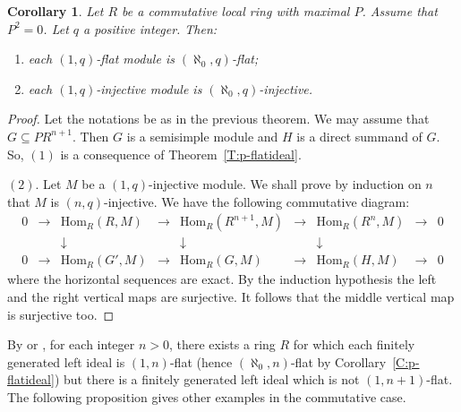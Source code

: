 \documentclass{amsart}
\newtheorem{corollary}[theorem]{Corollary}
\begin{document}
\begin{corollary} 
\label{C:OneAlepFlat} Let $R$ be a commutative local ring with maximal $P$. Assume that $P^2=0$. Let $q$ a positive integer. Then:
\begin{enumerate}
\item  each $(1,q)$-flat module is $(\aleph_0,q)$-flat;
\item  each $(1,q)$-injective module is $(\aleph_0,q)$-injective.
\end{enumerate}
\end{corollary}
\begin{proof}  Let the notations be as in the previous theorem. We may assume that $G\subseteq PR^{n+1}$. Then $G$ is a semisimple module and $H$ is a direct summand of $G$. So, $(1)$ is a consequence of Theorem~\ref{T:p-flatideal}.

$(2)$. Let $M$ be a $(1,q)$-injective module. We shall prove by induction on $n$ that $M$ is $(n,q)$-injective. We have the following commutative diagram:
\[\begin{matrix}
0 & \rightarrow & \mathrm{Hom}_R(R,M)& \rightarrow & \mathrm{Hom}_R(R^{n+1},M)& \rightarrow & \mathrm{Hom}_R(R^n,M)& \rightarrow & 0\\
{} & {} & \downarrow & {} & \downarrow & {} & \downarrow & {} & {} \\
0 & \rightarrow & \mathrm{Hom}_R(G',M)& \rightarrow & \mathrm{Hom}_R(G,M)& \rightarrow & \mathrm{Hom}_R(H,M)& \rightarrow & 0 
\end{matrix}\]
where the horizontal sequences are exact. By the induction hypothesis the left and the right vertical maps are surjective. It follows that the middle vertical map is surjective too.
\end{proof}

\bigskip
By \cite[Example 5.2]{Sha01} or \cite[Theorem 2.3]{Jon71}, for each integer $n>0$, there exists a ring $R$ for which each finitely generated left ideal is $(1,n)$-flat (hence $(\aleph_0,n)$-flat by Corollary~\ref{C:p-flatideal}) but there is a finitely generated left ideal which is not $(1,n+1)$-flat. The following proposition gives other examples in the commutative case.
\end{document}

